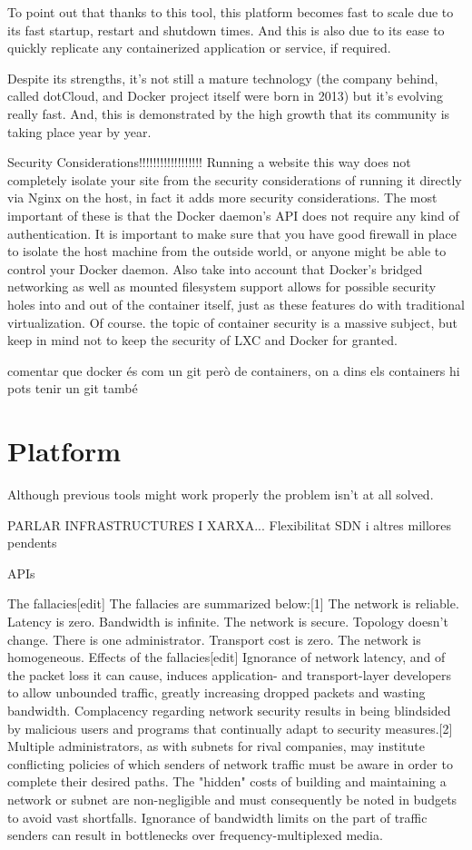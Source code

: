 To point out that thanks to this tool, this platform becomes fast to scale due to its fast startup, restart and shutdown times. And this is also due to its ease to quickly replicate any containerized application or service, if required. 

Despite its strengths, it's not still a mature technology (the company behind, called dotCloud, and Docker project itself were born in 2013) but it's evolving really fast. And, this is demonstrated by the high growth that its community is taking place year by year. 

Security Considerations!!!!!!!!!!!!!!!!!!
Running a website this way does not completely isolate your site from the security considerations of running it directly via Nginx on the host, in fact it adds more security considerations. The most important of these is that the Docker daemon’s API does not require any kind of authentication. It is important to make sure that you have good firewall in place to isolate the host machine from the outside world, or anyone might be able to control your Docker daemon. Also take into account that Docker’s bridged networking as well as mounted filesystem support allows for possible security holes into and out of the container itself, just as these features do with traditional virtualization. Of course. the topic of container security is a massive subject, but keep in mind not to keep the security of LXC and Docker for granted.

comentar que docker és com un git però de containers, on a dins els containers hi pots tenir un git també 

\section{Platform}

Although previous tools might work properly the problem isn't at all solved. 

PARLAR INFRASTRUCTURES I XARXA...
Flexibilitat
SDN
i altres millores pendents

APIs


The fallacies[edit]
The fallacies are summarized below:[1]
The network is reliable.
Latency is zero.
Bandwidth is infinite.
The network is secure.
Topology doesn't change.
There is one administrator.
Transport cost is zero.
The network is homogeneous.
Effects of the fallacies[edit]
Ignorance of network latency, and of the packet loss it can cause, induces application- and transport-layer developers to allow unbounded traffic, greatly increasing dropped packets and wasting bandwidth.
Complacency regarding network security results in being blindsided by malicious users and programs that continually adapt to security measures.[2]
Multiple administrators, as with subnets for rival companies, may institute conflicting policies of which senders of network traffic must be aware in order to complete their desired paths.
The "hidden" costs of building and maintaining a network or subnet are non-negligible and must consequently be noted in budgets to avoid vast shortfalls.
Ignorance of bandwidth limits on the part of traffic senders can result in bottlenecks over frequency-multiplexed media.


